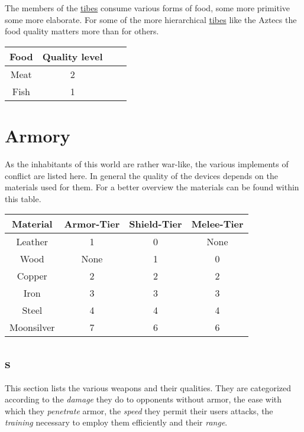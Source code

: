 \section{}\label{ch:Goods:Food}
The members of the \hyperref[ch:Tribes]{tibes} consume various forms of food,
some more primitive some more elaborate.
For some of the more hierarchical \hyperref[ch:Tribes]{tibes} like the \gls{Aztecs}
the food quality matters more than for others.


\begin{longtable}{cccc}
	\toprule
	Food & Quality level \\
	\midrule
	\Gls{Meat} & 2 \\
	\Gls{Fish} & 1 \\
	\bottomrule
\end{longtable}

\section{Armory}\label{ch:Goods:Armory}
As the inhabitants of this world are rather war-like, the various implements of
conflict are listed here. In general the quality of the devices depends on the
materials used for them. For a better overview the materials can be found
within this table.

\begin{longtable}{cccc}
	\toprule
	Material   & Armor-Tier & Shield-Tier & Melee-Tier \\
	\midrule
	Leather    & 1          & 0           & None       \\
	Wood       & None       & 1           & 0          \\
	Copper     & 2          & 2           & 2          \\
	Iron       & 3          & 3           & 3          \\
	Steel      & 4          & 4           & 4          \\
	Moonsilver & 7          & 6           & 6          \\ 
	\bottomrule
\end{longtable}

\subsection{s}\label{ch:Goods:Armory:Weapons}
This section lists the various weapons and
their qualities. They are categorized according to the \emph{damage} they do to
opponents without armor, the ease with which they \emph{penetrate} armor, the
\emph{speed} they permit their users attacks, the \emph{training} necessary to
employ them efficiently and their \emph{range}.

